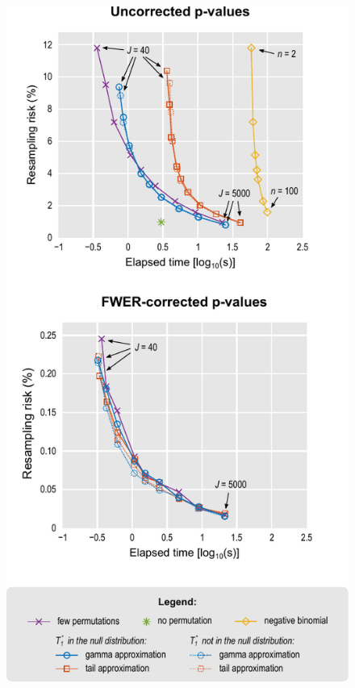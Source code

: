 \begin{figure}[!p]
\begin{center}
\includegraphics{figures/risk+timing_vert.pdf}
\end{center}
\label{fig:risk+timing_noref}
\end{figure}

